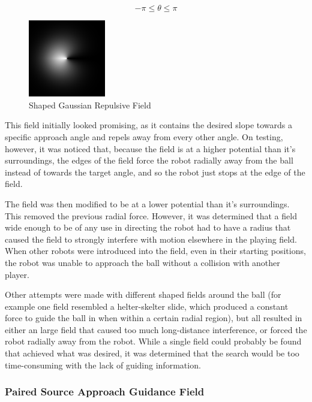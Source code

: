 \documentclass[10pt]{article}
\begin{document}
\[
-\pi\leq\theta\leq\pi
\]

\begin{figure}
 \centering
 \includegraphics[width=0.3\textwidth]{Images/wrapped-field}
 \caption{Shaped Gaussian Repulsive Field}
 \label{fig:wrappedGaussianField}
\end{figure}

This field initially looked promising, as it contains the desired slope towards
a specific approach angle and repels away from every other angle. On testing,
however, it was noticed that, because the field is at a higher potential than
it's surroundings, the edges of the field force the robot radially away from the
ball instead of towards the target angle, and so the robot just stops at the
edge of the field.

The field was then modified to be at a lower potential than it's surroundings.
This removed the previous radial force. However, it was determined that a field
wide enough to be of any use in directing the robot had to have a radius that
caused the field to strongly interfere with motion elsewhere in the playing
field. When other robots were introduced into the field, even in their starting
positions, the robot was unable to approach the ball without a collision with
another player.

Other attempts were made with different shaped fields around the ball (for
example one field resembled a helter-skelter slide, which produced a constant
force to guide the ball in when within a certain radial region), but all
resulted in either an large field that caused too much long-distance
interference, or forced the robot radially away from the robot. While a single
field could probably be found that achieved what was desired, it was determined
that the search would be too time-consuming with the lack of guiding
information.

\subsubsection{Paired Source Approach Guidance Field\label{sub:paired-field}}
\end{document}
